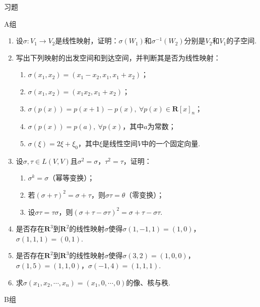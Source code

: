 \centerline{\heiti \Large 习题}
\vspace{2ex}
{\kaishu }
\begin{flushright}
    \kaishu

\end{flushright}
\centerline{\heiti A组}
\begin{enumerate}
    \item 设$\sigma: V_1\to V_2$是线性映射，证明：$\sigma(W_1)$和$\sigma^{-1}(W_2)$分别是$V_2$和$V_1$的子空间.
    \item 写出下列映射的出发空间和到达空间，并判断其是否为线性映射：
	\begin{enumerate}[label=(\arabic*)]
        \item $\sigma(x_1,x_2)=(x_1-x_2,x_1,x_1+x_2)$；
        \item $\sigma(x_1,x_2)=(x_1x_2,x_1+x_2)$；
        \item $\sigma(p(x))=p(x+1)-p(x),\ \forall p(x) \in \mathbf{R}[x]_n$；
        \item $\sigma(p(x))=p(a),\ \forall p(x)$，其中$a$为常数；
        \item $\sigma(\xi)=2\xi+\xi_0$，其中$\xi$是线性空间$V$中的一个固定向量.
    \end{enumerate}
	\item 设$\sigma,\tau \in L(V,V)$且$\sigma^2=\sigma$，$\tau^2=\tau$，证明：
	\begin{enumerate}[label=(\arabic*)]
        \item $\sigma^k=\sigma$（幂等变换）；
        \item 若$(\sigma+\tau)^2=\sigma+\tau$，则$\sigma\tau=\theta$（零变换）；
        \item 设$\sigma\tau=\tau\sigma$，则$(\sigma+\tau-\sigma\tau)^2=\sigma+\tau-\sigma\tau$.
    \end{enumerate}
	\item 是否存在$\mathbf{R}^3$到$\mathbf{R}^2$的线性映射$\sigma$使得$\sigma(1,-1,1)=(1,0)$，
	$\sigma(1,1,1)=(0,1)$.
    \item 是否存在$\mathbf{R}^2$到$\mathbf{R}^3$的线性映射$\sigma$使得$\sigma(3,2)=(1,0,0)$，$\sigma(1,5)=(1,1,0)$，$\sigma(-1,4)=(1,1,1)$.
    \item 求$\sigma(x_1,x_2,\cdots,x_n)=(x_1,0,\cdots,0)$的像、核与秩.
\end{enumerate}
\centerline{\heiti B组}
